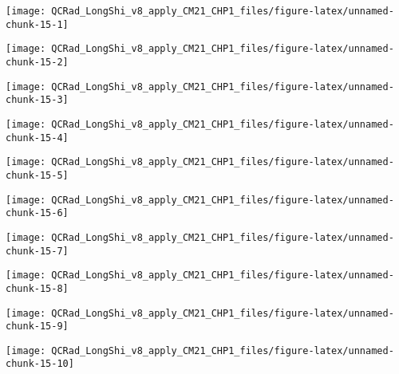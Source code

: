 \documentclass[
  10pt,
  a4paper,oneside]{article}
\begin{document}
\begin{center}\texttt{[image: QCRad\_LongShi\_v8\_apply\_CM21\_CHP1\_files/figure-latex/unnamed-chunk-15-1]} \end{center}

\begin{center}\texttt{[image: QCRad\_LongShi\_v8\_apply\_CM21\_CHP1\_files/figure-latex/unnamed-chunk-15-2]} \end{center}

\begin{center}\texttt{[image: QCRad\_LongShi\_v8\_apply\_CM21\_CHP1\_files/figure-latex/unnamed-chunk-15-3]} \end{center}

\begin{center}\texttt{[image: QCRad\_LongShi\_v8\_apply\_CM21\_CHP1\_files/figure-latex/unnamed-chunk-15-4]} \end{center}

\begin{center}\texttt{[image: QCRad\_LongShi\_v8\_apply\_CM21\_CHP1\_files/figure-latex/unnamed-chunk-15-5]} \end{center}

\begin{center}\texttt{[image: QCRad\_LongShi\_v8\_apply\_CM21\_CHP1\_files/figure-latex/unnamed-chunk-15-6]} \end{center}

\begin{center}\texttt{[image: QCRad\_LongShi\_v8\_apply\_CM21\_CHP1\_files/figure-latex/unnamed-chunk-15-7]} \end{center}

\begin{center}\texttt{[image: QCRad\_LongShi\_v8\_apply\_CM21\_CHP1\_files/figure-latex/unnamed-chunk-15-8]} \end{center}

\begin{center}\texttt{[image: QCRad\_LongShi\_v8\_apply\_CM21\_CHP1\_files/figure-latex/unnamed-chunk-15-9]} \end{center}

\begin{center}\texttt{[image: QCRad\_LongShi\_v8\_apply\_CM21\_CHP1\_files/figure-latex/unnamed-chunk-15-10]} \end{center}
\end{document}
